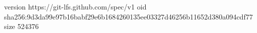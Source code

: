 version https://git-lfs.github.com/spec/v1
oid sha256:9d3da99e97b16babf29e6b1684260135ee03327d46256b11652d380a094cdf77
size 524376
